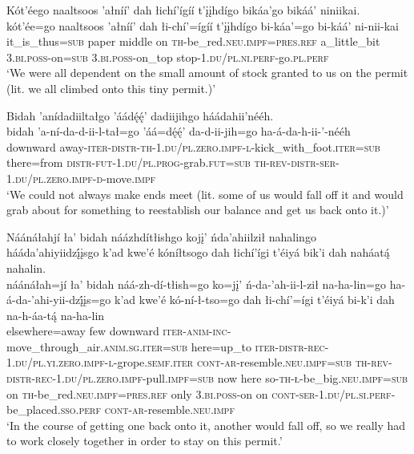 \ea\label{ex:text8-3-6}
Kót’éego naaltsoos ’ałníí’ dah łichí’ígíí t’įįhdígo bikáa’go bikáá’ niniikai.\\
\gll kót’ée=go	naaltsoos	’ałníí’	dah	łi-chí’=ígíí	t’įįhdígo	bi-káa’=go	bi-káá’	ni-nii-kai\\
     it\_is\_thus=\textsc{sub}	paper	middle	on	\textsc{th}-be\_red.\textsc{neu}.\textsc{impf}=\textsc{pres}.\textsc{ref}	a\_little\_bit	3.\textsc{bi}.\textsc{poss}-on=\textsc{sub}	3.\textsc{bi}.\textsc{poss}-on\_top	stop-1.\textsc{du}/\textsc{pl}.\textsc{ni}.\textsc{perf}-go.\textsc{pl}.\textsc{perf}\\
\glt `We were all dependent on the small amount of stock granted to us on the permit (lit. we all climbed onto this tiny permit.)'
\z

\ea\label{ex:text8-3-7}
Bidah ’anídadiiltałgo ’áádę́ę́’ dadiijihgo háádahii’nééh.\\
\gll bidah	’a-ní-da-d-ii-l-tał=go	’áá=dę́ę́’	da-d-ii-jih=go	ha-á-da-h-ii-’-nééh\\
     downward	away-\textsc{iter}-\textsc{distr}-\textsc{th}-1.\textsc{du}/\textsc{pl}.\textsc{zero}.\textsc{impf}-\textsc{l}-kick\_with\_foot.\textsc{iter}=\textsc{sub}	there=from	\textsc{distr}-\textsc{fut}-1.\textsc{du}/\textsc{pl}.\textsc{prog}-grab.\textsc{fut}=\textsc{sub}	\textsc{th}-\textsc{rev}-\textsc{distr}-\textsc{ser}-1.\textsc{du}/\textsc{pl}.\textsc{zero}.\textsc{impf}-\textsc{d}-move.\textsc{impf}\\
\glt `We could not always make ends meet (lit. some of us would fall off it and would grab about for something to reestablish our balance and get us back onto it.)'
\z

\ea\label{ex:text8-3-8}
Náánáłahjí ła’ bidah náázhdítłishgo kojį’ ńda’ahiilził nahalingo hááda’ahiyiidzį́įsgo k’ad kwe’é kóníłtsogo dah łichí’ígi t’éiyá bik’i dah naháatą́ nahalin.\\
\gll náánáłah=jí	ła’	bidah	náá-zh-dí-tłish=go	ko=jį’	ń-da-’ah-ii-l-ził	na-ha-lin=go	ha-á-da-’ahi-yii-dzį́įs=go	k’ad	kwe’é	kó-ní-ł-tso=go	dah	łi-chí’=ígi	t’éiyá	bi-k’i	dah	na-h-áa-tą́	na-ha-lin\\
     elsewhere=away	few	downward	\textsc{iter}-\textsc{anim}-\textsc{inc}-move\_through\_air.\textsc{anim}.\textsc{sg}.\textsc{iter}=\textsc{sub}	here=up\_to	\textsc{iter}-\textsc{distr}-\textsc{rec}-1.\textsc{du}/\textsc{pl}.\textsc{yi}.\textsc{zero}.\textsc{impf}-\textsc{l}-grope.\textsc{semf}.\textsc{iter}	\textsc{cont}-\textsc{ar}-resemble.\textsc{neu}.\textsc{impf}=\textsc{sub}	\textsc{th}-\textsc{rev}-\textsc{distr}-\textsc{rec}-1.\textsc{du}/\textsc{pl}.\textsc{zero}.\textsc{impf}-pull.\textsc{impf}=\textsc{sub}	now	here	so-\textsc{th}-\textsc{ł}-be\_big.\textsc{neu}.\textsc{impf}=\textsc{sub}	on	\textsc{th}-be\_red.\textsc{neu}.\textsc{impf}=\textsc{pres}.\textsc{ref}	only	3.\textsc{bi}.\textsc{poss}-on	on	\textsc{cont}-\textsc{ser}-1.\textsc{du}/\textsc{pl}.\textsc{si}.\textsc{perf}-be\_placed.\textsc{sso}.\textsc{perf}	\textsc{cont}-\textsc{ar}-resemble.\textsc{neu}.\textsc{impf}\\
\glt `In the course of getting one back onto it, another would fall off, so we really had to work closely together in order to stay on this permit.'
\z

